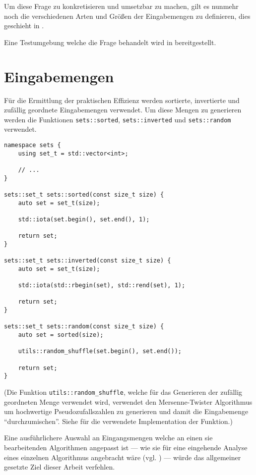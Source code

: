 Um diese Frage zu konkretisieren und umsetzbar zu machen, gilt es nunmehr noch die verschiedenen Arten und Größen der Eingabemengen zu definieren, dies geschieht in .

Eine Testumgebung welche die Frage behandelt wird in  bereitgestellt.

\section{Eingabemengen}
\label{sec:runtime-inputs}

Für die Ermittlung der praktischen Effizienz werden sortierte, invertierte und zufällig geordnete Eingabemengen verwendet. Um diese Mengen zu generieren werden die Funktionen \lstinline{sets::sorted}, \lstinline{sets::inverted} und \lstinline{sets::random} verwendet.

\begin{lstlisting}[caption=Funktionen welche Mengen der verwendeten Eingabemengearten generieren.]
namespace sets {
    using set_t = std::vector<int>;

    // ...
}

sets::set_t sets::sorted(const size_t size) {
	auto set = set_t(size);

	std::iota(set.begin(), set.end(), 1);

	return set;
}

sets::set_t sets::inverted(const size_t size) {
	auto set = set_t(size);

	std::iota(std::rbegin(set), std::rend(set), 1);

	return set;
}

sets::set_t sets::random(const size_t size) {
	auto set = sorted(size);

	utils::random_shuffle(set.begin(), set.end());

	return set;
}
\end{lstlisting}

(Die Funktion \lstinline{utils::random_shuffle}, welche für das Generieren der zufällig geordneten Menge verwendet wird, verwendet den Mersenne-Twister Algorithmus um hochwertige Pseudozufallszahlen zu generieren und damit die Eingabemenge \enquote{durchzumischen}. Siehe  für die verwendete Implementation der Funktion.)

Eine ausführlichere Auswahl an Eingangsmengen welche an einen sie bearbeitenden Algorithmen angepasst ist --- wie sie für eine eingehende Analyse eines einzelnen Algorithmus angebracht wäre (vgl. \cite[27ff]{mcg2012}) --- würde das allgemeiner gesetzte Ziel dieser Arbeit verfehlen.

